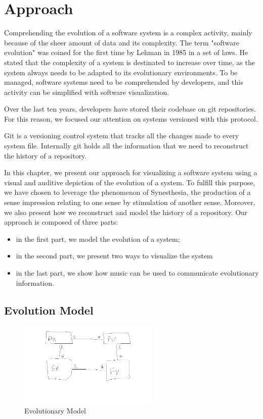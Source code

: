
\chapter[Approach]{Approach}
\graphicspath{ {images/approach} }

Comprehending the evolution of a software system is a complex activity, mainly because of the sheer amount of data and its complexity. 
The term "software evolution" was coined for the first time by Lehman in 1985 in a set of laws. \cite{Lehman1985}
He stated that the complexity of a system is destinated to increase over time, as the system always needs to be adapted to its evolutionary environments. 
To be managed, software systems need to be comprehended by developers, and this activity can be simplified with software visualization. 

Over the last ten years, developers have stored their codebase on git repositories. 
For this reason, we focused our attention on systems versioned with this protocol.

Git is a versioning control system that tracks all the changes made to every system file. 
Internally git holds all the information that we need to reconstruct the history of a repository. 

In this chapter, we present our approach for visualizing a software system using a visual and auditive depiction of the evolution of a system. 
To fulfill this purpose, we have chosen to leverage the phenomenon of Synesthesia, the production of a sense impression relating to one sense by stimulation of another sense.
Moreover, we also present how we reconstruct and model the history of a repository. 
\bigbreak
Our approach is composed of three parts: \begin{itemize}
\item in the first part, we model the evolution of a system; 
\item in the second part, we present two ways to visualize the system 
\item in the last part, we show how music can be used to communicate evolutionary information. 
\end{itemize}


\section{Evolution Model}

\begin{figure}[H]
    \includegraphics[width=0.6\textwidth]{EvolutionaryModel.jpg}
    \caption{Evolutionary Model}
    \label{fig:EvolutionaryModel1}
\end{figure}

